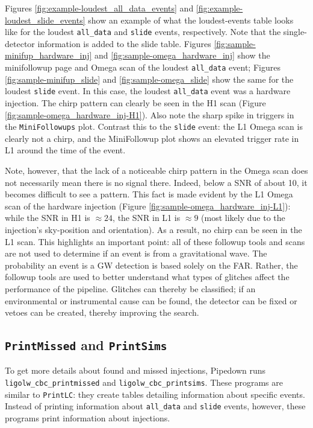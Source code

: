 Figures \ref{fig:example-loudest_all_data_events} and
\ref{fig:example-loudest_slide_events} show an example of what the
loudest-events table looks like for the loudest \verb|all_data| and
\verb|slide| events, respectively. Note that the single-detector information is
added to the slide table. Figures \ref{fig:sample-minifup_hardware_inj} and
\ref{fig:sample-omega_hardware_inj} show the minifollowup page and Omega scan
of the loudest \verb|all_data| event; Figures \ref{fig:sample-minifup_slide}
and \ref{fig:sample-omega_slide} show the same for the loudest \verb|slide|
event. In this case, the loudest \verb|all_data| event was a hardware
injection. The chirp pattern can clearly be seen in the H1 scan (Figure
\ref{fig:sample-omega_hardware_inj-H1}). Also note the sharp spike in triggers
in the \texttt{MiniFollowups} plot. Contrast this to the \verb|slide| event: the L1
Omega scan is clearly not a chirp, and the MiniFollowup plot shows an elevated
trigger rate in L1 around the time of the event.

Note, however, that the lack of a noticeable chirp pattern in the Omega scan
does not necessarily mean there is no signal there. Indeed, below a \ac{SNR} of
about 10, it becomes difficult to see a pattern. This fact is made evident by
the L1 Omega scan of the hardware injection (Figure
\ref{fig:sample-omega_hardware_inj-L1}): while the \ac{SNR} in H1 is $\approx
24$, the \ac{SNR} in L1 is $\approx 9$ (most likely due to the injection's
sky-position and orientation). As a result, no chirp can be seen in the L1
scan. This highlights an important point: all of these followup tools and scans
are not used to determine if an event is from a gravitational wave. The
probability an event is a \ac{GW} detection is based solely on the \ac{FAR}.
Rather, the followup tools are used to better understand what types of glitches
affect the performance of the pipeline. Glitches can thereby be classified; if
an environmental or instrumental cause can be found, the detector can be fixed
or vetoes can be created, thereby improving the search. 

\subsection{\texttt{PrintMissed} and \texttt{PrintSims}}
\label{sec:printmissed-printsims}

To get more details about found and missed injections, Pipedown runs
\verb|ligolw_cbc_printmissed| and \verb|ligolw_cbc_printsims|. These programs
are similar to \texttt{PrintLC}: they create tables detailing information about specific
events. Instead of printing information about \verb|all_data| and \verb|slide|
events, however, these programs print information about injections.

